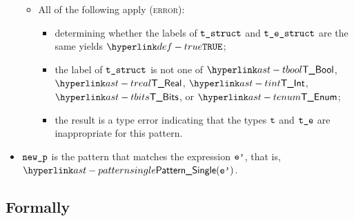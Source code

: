 \begin{itemize}
\begin{itemize}
    \item All of the following apply (\textsc{error}):
    \begin{itemize}
      \item determining whether the labels of $\vtstruct$ and $\testruct$ are the same yields $\True$\ProseOrTypeError;
      \item the label of $\vtstruct$ is not one of $\TBool$, $\TReal$, $\TInt$, $\TBits$, or $\TEnum$;
      \item the result is a type error indicating that the types $\vt$ and $\vte$ are inappropriate for this pattern.
    \end{itemize}
  \end{itemize}
  \item $\newp$ is the pattern that matches the expression $\vep$, that is, $\PatternSingle(\vep)$.
\end{itemize}



\subsection{Formally}
\begin{mathpar}
\end{mathpar}


